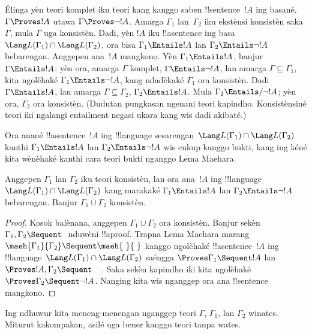 \documentclass[../../../include/open-logic-section]{subfiles}
\begin{document}
Élinga yèn teori komplet iku teori kang kanggo saben
!!{sentence}~$!A$ ing basané, $\Gamma \Proves !A$ utawa
$\Gamma \Proves \lnot !A$. Amarga $\Gamma_1$ lan~$\Gamma_2$
iku ekstènsi konsistèn saka~$\Gamma$, mula $\Gamma$
uga konsistèn. Dadi, yèn $!A$ iku !!a{sentence} ing basa
$\Lang L(\Gamma_1) \cap \Lang L(\Gamma_2)$, ora bisa
$\Gamma_1 \Entails !A$ lan
$\Gamma_2 \Entails \lnot !A$ bebarengan.
Anggepen ana~$!A$ mangkono. Yèn
$\Gamma_1 \Entails !A$, banjur $\Gamma \Entails !A$:
yèn ora, amarga $\Gamma$ komplet,
$\Gamma \Entails \lnot !A$, lan amarga
$\Gamma \subseteq \Gamma_1$, kita ngolèhaké
$\Gamma_1 \Entails \lnot !A$, kang ndadèkaké
$\Gamma_1$ ora konsistèn. Dadi $\Gamma \Entails !A$,
lan amarga $\Gamma \subseteq \Gamma_2$,
$\Gamma_2 \Entails !A$. Mula $\Gamma_2 \Entails/
\lnot !A$; yèn ora, $\Gamma_2$ ora konsistèn.
(Dudutan pungkasan ngenani teori kapindho. Konsistènsiné teori iki ngalangi entailment negasi ukara kang wis dadi akibaté.)

Ora anané !!a{sentence}~$!A$ ing
!!{language} sesarengan~$\Lang L(\Gamma_1) \cap \Lang L(\Gamma_2)$
kanthi $\Gamma_1 \Entails !A$ lan
$\Gamma_2 \Entails \lnot !A$ wis cukup kanggo bukti,
kang ing kéné kita wènèhaké kanthi cara teori bukti
nganggo Lema Maehara.

\begin{thm}
Anggepen $\Gamma_1$ lan $\Gamma_2$ iku teori konsistèn,
lan ora ana~$!A$ ing !!{language}
$\Lang L(\Gamma_1) \cap \Lang L(\Gamma_2)$ kang marakaké
$\Gamma_1 \Entails !A$ lan
$\Gamma_2 \Entails \lnot !A$ bebarengan. Banjur
$\Gamma_1 \cup \Gamma_2$ konsistèn.
\end{thm}

\begin{proof}
  Kosok balènana, anggepen $\Gamma_1 \cup \Gamma_2$
  ora konsistèn. Banjur sekèn
  $\Gamma_1, \Gamma_2 \Sequent \ $ nduwèni !!a{proof}.
  Trapna Lema Maehara marang
  $\maeh{\Gamma_1}{\Gamma_2} \Sequent \maeh{\ }{\ }$
  kanggo ngolèhaké !!a{sentence}~$!A$ ing
  !!{language}~$\Lang L(\Gamma_1) \cap \Lang L(\Gamma_2)$
  saéngga $\Proves \Gamma_1 \Sequent !A$ lan
  $\Proves !A, \Gamma_2 \Sequent \quad$. Saka sekèn
  kapindho iki kita ngolèhaké
  $\Proves \Gamma_2 \Sequent \lnot !A$.
  Nanging kita wis nganggep ora ana !!{sentence} mangkono.
\end{proof}

Ing ndhuwur kita meneng-menengan nganggep teori
$\Gamma$, $\Gamma_1$, lan $\Gamma_2$ winates.
Miturut kakompakan, asilé uga bener kanggo teori
tanpa wates.
\end{document}
